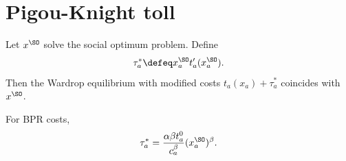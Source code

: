 \section{Pigou-Knight toll}

\begin{theorem}\label{thm:pigou_toll}
Let $x^{\SO}$ solve the social optimum problem. Define
\[
\tau_a^* \defeq x_a^{\SO}t_a'(x_a^{\SO}).
\]
Then the Wardrop equilibrium with modified costs $t_a(x_a)+\tau_a^*$ coincides with $x^{\SO}$.
\end{theorem}

\begin{corollary}
For BPR costs,
\[
\tau_a^* = \frac{\alpha\beta t_a^0}{c_a^\beta}(x_a^{\SO})^\beta.
\]
\end{corollary}
